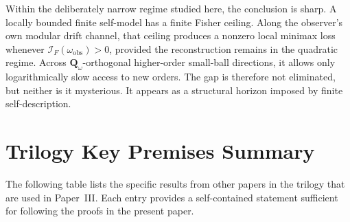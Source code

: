 \documentclass[12pt]{article}
\theoremstyle{definition}
\theoremstyle{remark}
\begin{document}
Within the deliberately narrow regime studied here, the conclusion is
sharp. A locally bounded finite self-model has a finite Fisher ceiling.
Along the observer's own modular drift channel, that ceiling produces a
nonzero local minimax loss whenever
\(\mathcal{I}_F(\omega_{\mathrm{obs}})>0\), provided the
reconstruction remains in the quadratic regime. Across
\(\mathbf{Q}_\omega\)-orthogonal higher-order small-ball directions, it
allows only logarithmically slow access to new orders. The gap is
therefore not eliminated, but neither is it mysterious. It appears as a
structural horizon imposed by finite self-description.

\appendix

\section{Trilogy Key Premises Summary}\label{app:premises}

The following table lists the specific results from other papers in the
trilogy that are used in Paper~III. Each entry provides a self-contained
statement sufficient for following the proofs in the present paper.
\end{document}
